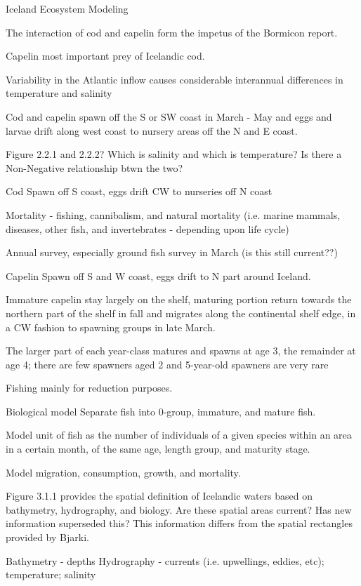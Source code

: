 \documentclass{report}
\begin{document}
Iceland Ecosystem Modeling

\cite{bormicon}

The interaction of cod and capelin form the impetus of the Bormicon report.

Capelin most important prey of Icelandic cod. 

Variability in the Atlantic inflow causes considerable interannual differences in temperature and salinity

Cod and capelin spawn off the S or SW coast in March - May and eggs and larvae drift along west coast to nursery areas off the N and E coast. 

Figure 2.2.1 and 2.2.2? Which is salinity and which is temperature? Is there a Non-Negative relationship btwn the two?

Cod
Spawn off S coast, eggs drift CW to nurseries off N coast

Mortality - fishing, cannibalism, and natural mortality (i.e. marine mammals, diseases, other fish, and invertebrates - depending upon life cycle)

Annual survey, especially ground fish survey in March (is this still current??)

Capelin
 Spawn off S and W coast, eggs drift to N part around Iceland.

Immature capelin stay largely on the shelf, maturing portion return towards the northern part of the shelf in fall and migrates along the continental shelf edge, in a CW fashion to spawning groups in late March.

The larger part of each year-class matures and spawns at age 3, the remainder at age 4; there are few spawners aged 2 and 5-year-old spawners are very rare

Fishing mainly for reduction purposes.

Biological model
Separate fish into 0-group, immature, and mature fish.

Model unit of fish as the number of individuals of a given species within an area in a certain month, of the same age, length group, and maturity stage. 

Model migration, consumption, growth, and mortality.

Figure 3.1.1 provides the spatial definition of Icelandic waters based on bathymetry, hydrography, and biology. Are these spatial areas current? Has new information superseded this? This information differs from the spatial rectangles provided by Bjarki.

Bathymetry - depths
Hydrography - currents (i.e. upwellings, eddies, etc); temperature; salinity 
\end{document}
